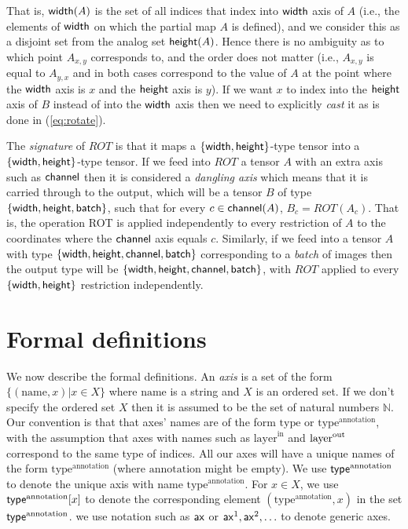 \documentclass{article}
\begin{document}
That is, $\mathsf{width}(A)$ is the set of all indices that index into $\mathsf{width}$ axis of $A$ (i.e., the elements of $\mathsf{width}$ on which the partial map $A$ is defined), and we consider this as a disjoint set from the analog set $\mathsf{height}(A)$. Hence there is no ambiguity as to which point $A_{x,y}$ corresponds to, and the order does not matter (i.e., $A_{x,y}$ is equal to $A_{y,x}$ and in both cases correspond to the value of $A$ at the point where the $\mathsf{width}$ axis is $x$ and the $\mathsf{height}$ axis is $y$).
If we want $x$ to index into the $\mathsf{height}$ axis of $B$ instead of into the $\mathsf{width}$ axis then we need to explicitly \emph{cast} it as is done in (\ref{eq:rotate}).

The \emph{signature} of $ROT$ is that it maps a $\{ \mathsf{width} , \mathsf{height} \}$-type tensor into a $\{ \mathsf{width} , \mathsf{height} \}$-type tensor.
If we feed into $ROT$ a tensor $A$ with an extra axis such as $\mathsf{channel}$ then it is considered a \emph{dangling axis} which means that it is carried through to the output, which will be a tensor $B$ of type $\{ \mathsf{width} , \mathsf{height}  , \mathsf{batch} \}$, such that for every $c \in \mathsf{channel}(A)$, $B_c = ROT(A_c)$. 
That is, the operation ROT is applied independently to every restriction of $A$ to the coordinates where the $\mathsf{channel}$ axis equals $c$.
Similarly, if we feed into a tensor $A$ with type $\{ \mathsf{width} , \mathsf{height} , \mathsf{channel} , \mathsf{batch} \}$ corresponding to a \emph{batch} of images then the output type will be $\{ \mathsf{width} , \mathsf{height} , \mathsf{channel} , \mathsf{batch} \}$, with $ROT$ applied to every $\{ \mathsf{width},\mathsf{height} \}$ restriction independently.

\section{Formal definitions}

We now describe the formal definitions. An \emph{axis} is a set of the form $\{ (\text{name}  ,x ) | x\in X \}$ where $\text{name}$ is a string  and  $X$ is an ordered set. 
If we don't specify the ordered set $X$ then it is assumed to be the set of natural numbers $\mathbb{N}$.
Our convention is that that axes' names are of the form $\text{type}$ or $\text{type}^{\text{annotation}}$, with the assumption that axes with names such as $\text{layer}^{\text{in}}$ and $\mathsf{\text{layer}}^{\text{out}}$ correspond to the same type of indices. 
All our axes will have a unique names of the form $\text{type}^{\text{annotation}}$ (where $\text{annotation}$ might be empty). 
We use $\mathsf{type}^{\text{annotation}}$ to denote the unique axis with name $\text{type}^{\text{annotation}}$.
For $x\in X$, we use $\mathsf{type}^{\text{annotation}}[x]$ to denote the corresponding element $(\text{type}^{\text{annotation}}, x)$ in the set $\mathsf{type}^{\text{annotation}}$.
we use notation such as $\mathsf{ax}$ or  $\mathsf{ax}^1,\mathsf{ax}^2,\ldots$ to denote generic axes.
\end{document}
